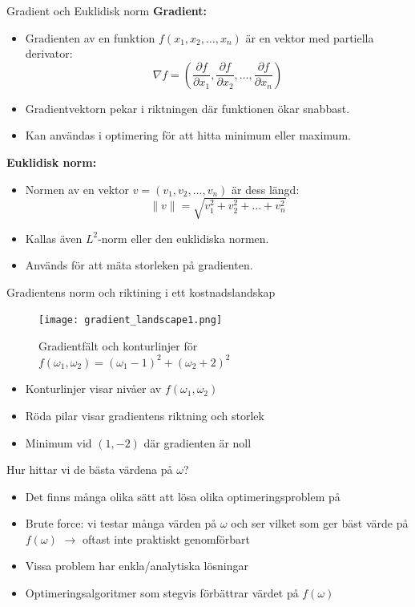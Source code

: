\documentclass[10pt,english]{beamer}
\begin{document}
\begin{frame}{Gradient och Euklidisk norm}
    \textbf{Gradient:}
    \begin{itemize}
        \item Gradienten av en funktion $f(x_1, x_2, \dots, x_n)$ är en vektor med partiella derivator:
        \[
        \nabla f = \left( \frac{\partial f}{\partial x_1}, \frac{\partial f}{\partial x_2}, \dots, \frac{\partial f}{\partial x_n} \right)
        \]
        \item Gradientvektorn pekar i riktningen där funktionen ökar snabbast.
        \item Kan användas i optimering för att hitta minimum eller maximum.
    \end{itemize}

    \vspace{0.4cm}
    \textbf{Euklidisk norm:}
    \begin{itemize}
        \item Normen av en vektor $v = (v_1, v_2, \dots, v_n)$ är dess längd:
        \[
        \|v\| = \sqrt{v_1^2 + v_2^2 + \dots + v_n^2}
        \]
        \item Kallas även $L^2$-norm eller den euklidiska normen.
        \item Används för att mäta storleken på gradienten.
    \end{itemize}
\end{frame}

\begin{frame}{Gradientens norm och riktining i ett kostnadslandskap}
    \begin{figure}[htbp]
        \centering
        \texttt{[image: gradient\_landscape1.png]}
        \caption*{Gradientfält och konturlinjer för $f(\omega_1, \omega_2) = 
        (\omega_1 - 1)^2 + (\omega_2 + 2)^2$}
    \end{figure}
    \begin{itemize}
        \item Konturlinjer visar nivåer av $f(\omega_1, \omega_2)$
        \item Röda pilar visar gradientens riktning och storlek
        \item Minimum vid $(1, -2)$ där gradienten är noll
    \end{itemize}
\end{frame}


\begin{frame}{Hur hittar vi de bästa värdena på $\omega$?}
    \begin{itemize}
        \item Det finns många olika sätt att lösa olika optimeringsproblem på
        \item Brute force: vi testar många värden på $\omega$ och ser vilket som ger bäst värde på $f(\omega)$ $\rightarrow$ oftast inte praktiskt genomförbart
        \item Vissa problem har enkla/analytiska lösningar
        \item Optimeringsalgoritmer som stegvis förbättrar värdet på $f(\omega)$
    \end{itemize}
\end{frame}
\end{document}
